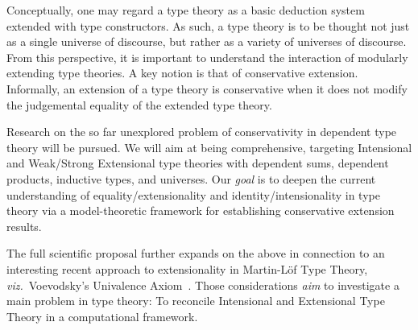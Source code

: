 \documentclass[11pt,twocolumn]{article}
\newcommand{\eg}{\emph{eg.}}
\newcommand{\viz}{\emph{viz.}}
\begin{document}
Conceptually, one may regard a type theory as a basic deduction system
extended with type constructors. 
As such, a type theory is to be thought not just as a single universe of
discourse, but rather as a variety of universes of discourse. 
From this perspective, it is important to understand the interaction of
modularly extending type theories.  A key notion %
is that of conservative extension.
Informally, an extension %
of a type theory is conservative when it does not modify the judgemental
equality of the extended type theory.
%

Research on the 
so far unexplored 
problem of conservativity in dependent type theory 
will be pursued.  We will aim at being comprehensive, targeting Intensional
and Weak/Strong Extensional type theories with
dependent sums, dependent products, inductive types, and universes.  Our
\emph{goal} is to deepen the current understanding of equality/extensionality
and identity/intensionality in type theory via a model-theoretic framework for
establishing conservative extension results.  

The full scientific proposal further expands on the above in connection to an
interesting recent approach to extensionality in Martin-L\"of Type Theory,
\viz~Voevodsky's Univalence Axiom~\cite{UnivalentProgramme}. 
Those considerations 
\emph{aim} %
to investigate a main problem in type theory: To reconcile Intensional and
Extensional Type Theory in a computational framework.
\end{document}
